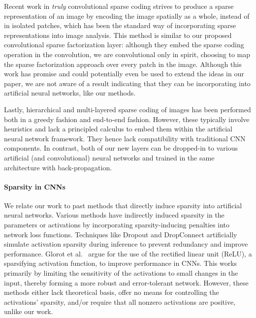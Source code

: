 \documentclass[10pt,twocolumn,letterpaper]{article}
\begin{document}
Recent work in \textit{truly} convolutional sparse coding 
\cite{KaSeBoNIPS2010,BrErLuCVPR2013} strives to produce a sparse representation 
of an image by encoding the image spatially as a whole, instead of in isolated 
patches, which has been the standard way of incorporating sparse 
representations into image analysis.  This method is similar to our proposed 
convolutional sparse factorization layer: although they embed the sparse coding 
operation in the convolution, we are convolutional only in spirit, choosing to 
map the sparse factorization approach over every patch in the image.  Although 
this work has promise and could potentially even be used to extend the ideas in 
our paper, we are not aware of a result indicating that they can be incorporating 
into artificial 
neural networks, like our methods.

Lastly, hierarchical and multi-layered sparse coding of images \cite{YuLiLaCVPR2011,YaYuHuCVPR2010,BoReFoNIPS2011} has been performed both in a greedy fashion and end-to-end fashion.  However, these typically involve heuristics and lack a principled calculus to embed them within the artificial neural network framework.  They hence lack compatibility with traditional CNN components.  In contrast, both of our new layers can be dropped-in to various artificial (and convolutional) neural networks and trained in the same architecture with back-propagation.



\paragraph{Sparsity in CNNs}
We relate our work to past methods that directly induce sparsity into artificial neural networks.
Various methods \cite{SeNeurComp1997,NgICML2004,BoCuNIPS2008} have indirectly induced sparsity in the parameters or activations by incorporating sparsity-inducing penalties into network loss functions. Techniques like Dropout \cite{SrHiKrJMLR2014} and DropConnect \cite{WaZeZhICML2013} artificially simulate activation sparsity during inference to prevent redundancy and improve performance.
Glorot et al.~\cite{GlBoBeAIStats2011} argue for the use of the rectified linear unit (ReLU), a sparsifying activation function, to improve performance in CNNs. 
This works primarily by limiting the sensitivity of the activations to small changes in the input, thereby forming a more robust and error-tolerant network. However, these methods either lack theoretical basis, offer no means for controlling the activations' sparsity, and/or require that all nonzero activations are positive, unlike our work.
\end{document}
